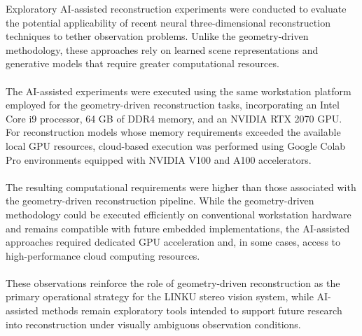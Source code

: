 Exploratory AI-assisted reconstruction experiments were conducted to evaluate the potential applicability of recent neural three-dimensional reconstruction techniques to tether observation problems. Unlike the geometry-driven methodology, these approaches rely on learned scene representations and generative models that require greater computational resources.
\\\\
The AI-assisted experiments were executed using the same workstation platform employed for the geometry-driven reconstruction tasks, incorporating an Intel Core i9 processor, 64 GB of DDR4 memory, and an NVIDIA RTX 2070 GPU. For reconstruction models whose memory requirements exceeded the available local GPU resources, cloud-based execution was performed using Google Colab Pro environments equipped with NVIDIA V100 and A100 accelerators.
\\\\
The resulting computational requirements were higher than those associated with the geometry-driven reconstruction pipeline. While the geometry-driven methodology could be executed efficiently on conventional workstation hardware and remains compatible with future embedded implementations, the AI-assisted approaches required dedicated GPU acceleration and, in some cases, access to high-performance cloud computing resources.
\\\\
These observations reinforce the role of geometry-driven reconstruction as the primary operational strategy for the LINKU stereo vision system, while AI-assisted methods remain exploratory tools intended to support future research into reconstruction under visually ambiguous observation conditions.
